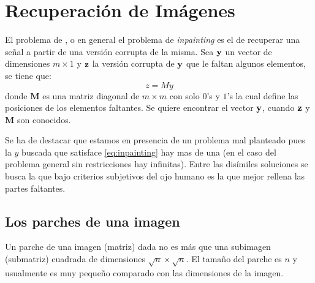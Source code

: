 \chapter{Recuperaci\'on de Imágenes}\label{chapter:ImIp} %

\begin{definition}
El problema de \II, o en general el problema de \textit{inpainting} es el de recuperar una señal a partir de una versi\'on corrupta de la misma. Sea $\mathbf{y}$ un vector de dimensiones $m \times 1$ y $\mathbf{z}$ la versi\'on corrupta de $\mathbf{y}$ que le faltan algunos elementos, se tiene que:
\begin{equation}
	z = My
	\label{eq:inpainting}
\end{equation}
donde $\mathbf{M}$ es una matriz diagonal de $m \times m$ con solo $0$'s y $1$'s la cual define las posiciones de los elementos faltantes. Se quiere encontrar el vector $\mathbf{y}$, cuando $\mathbf{z}$ y  $\mathbf{M}$ son conocidos. 
\end{definition}

Se ha de destacar que estamos en presencia de un problema mal planteado pues la $y$ buscada que satisface \ref{eq:inpainting} hay mas de una (en el caso del problema general sin restricciones hay infinitas). Entre las dis\'imiles soluciones se busca la que bajo criterios subjetivos del ojo humano es la que mejor rellena las partes faltantes. 

\section{Los parches de una imagen}

\begin{definition}
	Un parche  de una imagen (matriz) dada no es m\'as que una subimagen (submatriz) cuadrada de dimensiones $\sqrt{n} \times \sqrt{n}$. El tamaño del parche es $n$ y usualmente es muy peque\~no comparado con las dimensiones de la imagen.
\end{definition}

